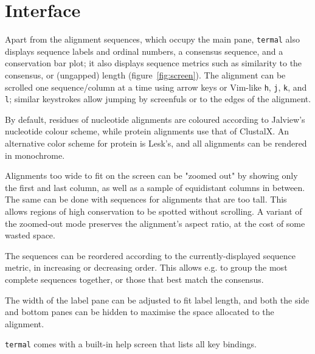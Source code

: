 \documentclass[11pt]{article}
\begin{document}
\section*{Interface}

Apart from the alignment sequences, which occupy the main pane, \texttt{termal}
also displays sequence labels and  ordinal numbers, a consensus sequence, and a
conservation bar plot; it also displays sequence metrics such as similarity to
the consensus, or (ungapped) length (figure~\ref{fig:screen}). The alignment can
be scrolled one sequence/column at a time using arrow keys or Vim-like
\texttt{h}, \texttt{j}, \texttt{k}, and \texttt{l}; similar keystrokes allow
jumping by screenfuls or to the edges of the alignment.

By default, residues of nucleotide alignments are coloured according to
Jalview's\cite{waterhouse2009jalview} nucleotide colour scheme, while protein
alignments use that of ClustalX\cite{larkin2007clustal}. An alternative color
scheme for protein is Lesk's\cite{lesk2019introduction}, and all alignments can
be rendered in monochrome. 

Alignments too wide to fit on the screen can be "zoomed out" by showing only the
first and last column, as well as a sample of equidistant columns in between.
The same can be done with sequences for alignments that are too tall. This
allows regions of high conservation to be spotted without scrolling. A variant
of the zoomed-out mode preserves the alignment's aspect ratio, at the cost of
some wasted space.

The sequences can be reordered according to the currently-displayed sequence
metric, in increasing or decreasing order. This allows e.g. to group the most
complete sequences together, or those that best match the consensus.

The width of the label pane can be adjusted to fit label length, and both the
side and bottom panes can be hidden to maximise the space allocated to the
alignment.

\texttt{termal} comes with a built-in help screen that lists all key bindings.
\end{document}
